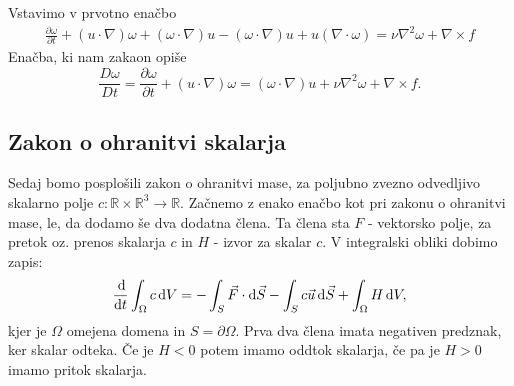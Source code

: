 \documentclass[mat2, tisk]{fmfdelo}
\newcommand{\R}{\mathbb R}
\begin{document}
Vstavimo v prvotno enačbo
\begin{align*}
\frac{\partial \omega}{\partial t} + (u\cdot \nabla)\omega + (\omega \cdot \nabla)u - (\omega \cdot \nabla)u + u (\nabla \cdot \omega) =  \nu\nabla^2 \omega + \nabla \times f
\end{align*}
Enačba, ki nam zakaon opiše 
\begin{equation}
\frac{D\omega}{D t} = \frac{\partial \omega}{\partial t} + (u\cdot \nabla)\omega = (\omega \cdot \nabla)u+ \nu \nabla^2 \omega + \nabla \times f.
\end{equation}

\subsection{Zakon o ohranitvi skalarja}
Sedaj bomo posplošili zakon o ohranitvi mase, za poljubno zvezno odvedljivo skalarno polje $c: \R\times \R^3 \rightarrow \R$.
Začnemo z enako enačbo kot pri zakonu o ohranitvi mase, le, da dodamo še dva dodatna 
člena. Ta člena sta $F$ - vektorsko polje, za pretok oz. prenos skalarja $c$ in $H$ - izvor za skalar $c$.
V integralski obliki dobimo zapis:
\begin{equation}
\frac{\dif}{\dif t} \int_{\Omega} c \dif V = - \int_S \vec{F} \cdot \dif \vec{S} - 
\int_S c \vec{u}  \dif \vec{S} + \int_\Omega H \dif V,
\end{equation}
kjer je $\Omega$ omejena domena in $S = \partial \Omega$.
Prva dva člena imata negativen predznak, ker skalar odteka. Če je $H < 0$ potem 
imamo oddtok skalarja, če pa je $H > 0$ imamo pritok skalarja. 
\end{document}
